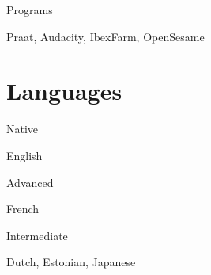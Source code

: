 \documentclass[12pt]{article} %
\begin{document}
\begin{minipage}[t]{3cm}
Programs
\end{minipage}
\begin{minipage}[t]{\smallertextwidth}Praat, Audacity, IbexFarm, OpenSesame\end{minipage}

\section{Languages}
{
\begin{minipage}[t]{3cm}
Native
\end{minipage}
\begin{minipage}[t]{\smallertextwidth}English\end{minipage}
}
{
\begin{minipage}[t]{3cm}
Advanced
\end{minipage}
\begin{minipage}[t]{\smallertextwidth}French\end{minipage}
}
{
\begin{minipage}[t]{3cm}
Intermediate
\end{minipage}
\begin{minipage}[t]{\smallertextwidth}Dutch, Estonian, Japanese\end{minipage}
}

%
%
%
\end{document}
